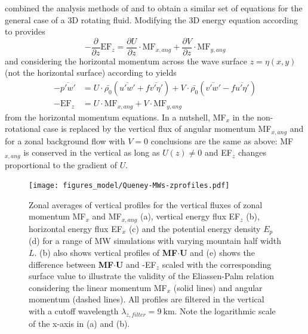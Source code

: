 \textcite[]{broad_linear_1995} combined the analysis methods of \textcite[]{eliassen_transfer_1960} and \textcite[]{bretherton_momentum_1969} to obtain a similar set of equations for the general case of a 3D rotating fluid. Modifying the 3D energy equation according to \textcite[]{eliassen_transfer_1960} provides 
\begin{equation}
    -\frac{\partial}{\partial z} \mathrm{EF}_z = \frac{\partial U}{\partial z} \cdot \mathrm{MF}_{x,ang} + \frac{\partial V}{\partial z} \cdot \mathrm{MF}_{y,ang}
    \label{equ:EP-relation-rotating-dudz}
\end{equation}
and considering the horizontal momentum across the wave surface $z=\eta(x,y)$ (not the horizontal surface) according to \textcite[]{bretherton_momentum_1969} yields
\begin{equation}
    \begin{aligned}
        -\overbar{p'w'}& = U \cdot \bar{\rho_0} (\overbar{u'w'} + f \overbar{v' \eta'}) + V \cdot \bar{\rho_0} (\overbar{v'w'} - f \overbar{u' \eta'}) \\
        -\mathrm{EF}_z& = U \cdot \mathrm{MF}_{x,ang} + V \cdot \mathrm{MF}_{y,ang}
    \end{aligned}
    \label{equ:EP-relation-rotating}
\end{equation}
from the horizontal momentum equations. In a nutshell, MF$_x$ in the non-rotational case is replaced by the vertical flux of angular momentum MF$_{x,ang}$ and for a zonal background flow with $V=0$ conclusions are the same as above: MF$_{x,ang}$ is conserved in the vertical as long as $U(z) \neq 0$ and EF$_z$ changes proportional to the gradient of $U$.

\begin{figure}[t]
    \centering
    \texttt{[image: figures\_model/Queney-MWs-zprofiles.pdf]}
    \caption{Zonal averages of vertical profiles for the vertical fluxes of zonal momentum MF$_x$ and MF$_{x,ang}$ (a), vertical energy flux EF$_z$ (b), horizontal energy flux EF$_x$ (c) and the potential energy density $E_p$ (d) for a range of MW simulations with varying mountain half width $L$. (b) also shows vertical profiles of \textbf{MF}$\cdot$\textbf{U} and (e) shows the difference between \textbf{MF}$\cdot$\textbf{U} and -EF$_z$ scaled with the corresponding surface value to illustrate the validity of the Eliassen-Palm relation considering the linear momentum MF$_x$ (solid lines) and angular momentum (dashed lines). All profiles are filtered in the vertical with a cutoff wavelength $\lambda_{z,filter}=\SI{9}{\kilo\meter}$. Note the logarithmic scale of the x-axis in (a) and (b).}
    \label{fig:MWs-zprofiles}
\end{figure}

